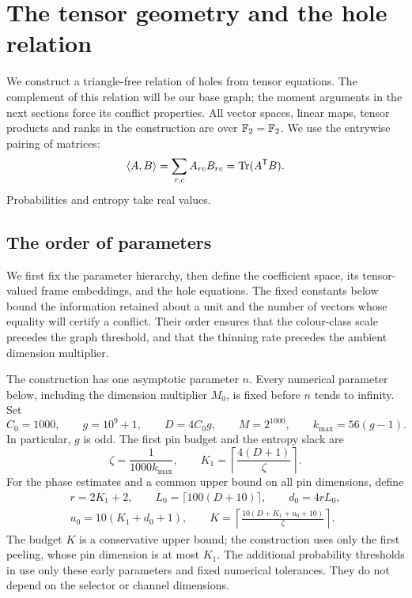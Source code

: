 \section{The tensor geometry and the hole relation}\label{sec:geometry}

We construct a triangle-free relation of holes from tensor equations.
The complement of this relation will be our base graph; the moment
arguments in the next sections force its conflict properties.
All vector spaces, linear maps, tensor products and ranks in the construction are over \(\mathbb F_2=\mathbb F_2\).
We use the entrywise pairing of matrices:
\[
 \langle A,B\rangle=\sum_{r,c}A_{rc}B_{rc}=\operatorname{Tr}(A^{\mathsf T} B).
\]
Probabilities and entropy take real values.

\subsection{The order of parameters}

We first fix the parameter hierarchy, then define the coefficient
space, its tensor-valued frame embeddings, and the hole equations.
The fixed constants below bound the information retained about a unit
and the number of vectors whose equality will certify a conflict.
Their order ensures that the colour-class scale precedes the graph
threshold, and that the thinning rate precedes the ambient dimension
multiplier.

The construction has one asymptotic parameter \(n\).  Every numerical parameter below, including the dimension multiplier \(M_0\), is fixed before \(n\) tends to infinity.
Set
\begin{equation}\label{eq:early-constants}
 C_0=1000,\qquad g=10^9+1,\qquad
 D=4C_0g,\qquad M=2^{1000},\qquad
 k_{\max}=56(g-1).
\end{equation}
In particular, \(g\) is odd.  The first pin budget and the entropy slack are
\begin{equation}\label{eq:pin-budgets}
 \zeta=\frac{1}{1000k_{\max}},
 \qquad K_1=\left\lceil\frac{4(D+1)}{\zeta}\right\rceil.
\end{equation}
For the phase estimates and a common upper bound on all pin dimensions, define
\begin{equation}\label{eq:law-budgets}
 \begin{gathered}
 r=2K_1+2,\qquad L_0=\lceil100(D+10)\rceil,\qquad
 d_0=4rL_0,\\
 u_0=10(K_1+d_0+1),\qquad
 K=\left\lceil\frac{10(D+K_1+u_0+10)}{\zeta}\right\rceil .
 \end{gathered}
\end{equation}
The budget \(K\) is a conservative upper bound; the construction uses only
the first peeling, whose pin dimension is at most \(K_1\).
The additional probability thresholds in  use only these early parameters and fixed numerical tolerances.  They do not depend on the selector or channel dimensions.

